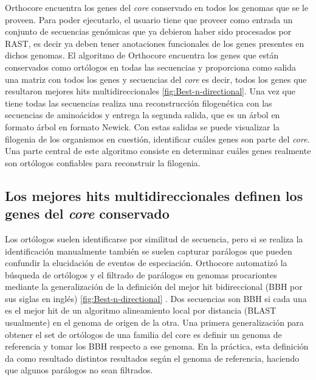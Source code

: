 \documentclass[12pt,twoside]{reedthesis}
\begin{document}
  Orthocore encuentra los genes del \emph{core} conservado en todos los
  genomas que se le proveen. Para poder ejecutarlo, el usuario tiene que
  proveer como entrada un conjunto de secuencias genómicas que ya debieron
  haber sido procesados por RAST, es decir ya deben tener anotaciones
  funcionales de los genes presentes en dichos genomas. El algoritmo de
  Orthocore encuentra los genes que están conservados como ortólogos en
  todas las secuencias y proporciona como salida una matriz con todos los
  genes y secuencias del \emph{core} es decir, todos los genes que
  resultaron mejores hits multidireccionales
  \autoref{fig:Best-n-directional}. Una vez que tiene todas las secuencias
  realiza una reconstrucción filogenética con las secuencias de
  aminoácidos y entrega la segunda salida, que es un árbol en formato
  árbol en formato Newick. Con estas salidas se puede visualizar la
  filogenia de los organismos en cuestión, identificar cuáles genes son
  parte del \emph{core}. Una parte central de este algoritmo consiste en
  determinar cuáles genes realmente son ortólogos confiables para
  reconstruir la filogenia.
  
  \subsection{\texorpdfstring{Los mejores hits multidireccionales definen
  los genes del \emph{core}
  conservado}{Los mejores hits multidireccionales definen los genes del core conservado}}\label{los-mejores-hits-multidireccionales-definen-los-genes-del-core-conservado}
  
  Los ortólogos suelen identificarse por similitud de secuencia, pero si
  se realiza la identificación manualmente también se suelen capturar
  parálogos que pueden confundir la elucidación de eventos de especiación.
  Orthocore automatizó la búsqueda de ortólogos y el filtrado de parálogos
  en genomas procariontes mediante la generalización de la definición del
  mejor hit bidireccional (BBH por sus siglas en inglés)
  \autoref{fig:Best-n-directional} . Dos secuencias son BBH si cada una es
  el mejor hit de un algoritmo alineamiento local por distancia (BLAST
  usualmente) en el genoma de origen de la otra. Una primera
  generalización para obtener el set de ortólogos de una familia del core
  es definir un genoma de referencia y tomar los BBH respecto a ese
  genoma. En la práctica, esta definición da como resultado distintos
  resultados según el genoma de referencia, haciendo que algunos parálogos
  no sean filtrados.
  
\end{document}

